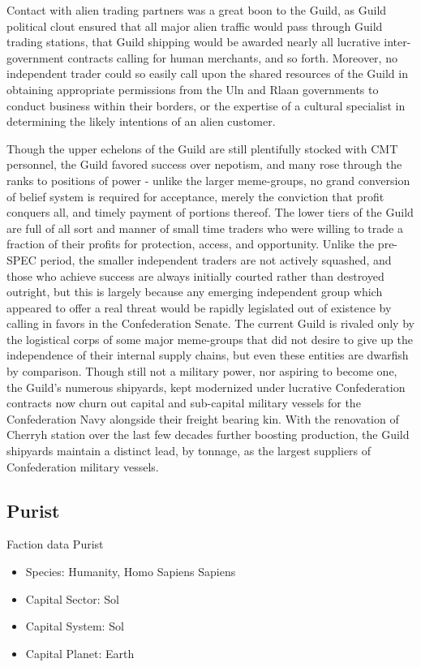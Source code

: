 Contact with alien trading partners was a great boon to the Guild, as
Guild political clout ensured that all major alien traffic would pass
through Guild trading stations, that Guild shipping would be awarded
nearly all lucrative inter-government contracts calling for human
merchants, and so forth. Moreover, no independent trader could so
easily call upon the shared resources of the Guild in obtaining
appropriate permissions from the Uln and Rlaan governments to conduct
business within their borders, or the expertise of a cultural
specialist in determining the likely intentions of an alien customer.

Though the upper echelons of the Guild are still plentifully stocked
with CMT personnel, the Guild favored success over nepotism, and many
rose through the ranks to positions of power - unlike the larger
meme-groups, no grand conversion of belief system is required for
acceptance, merely the conviction that profit conquers all, and timely
payment of portions thereof. The lower tiers of the Guild are full of
all sort and manner of small time traders who were willing to trade a
fraction of their profits for protection, access, and
opportunity. Unlike the pre-SPEC period, the smaller independent
traders are not actively squashed, and those who achieve success are
always initially courted rather than destroyed outright, but this is
largely because any emerging independent group which appeared to offer
a real threat would be rapidly legislated out of existence by calling
in favors in the Confederation Senate. The current Guild is rivaled
only by the logistical corps of some major meme-groups that did not
desire to give up the independence of their internal supply chains,
but even these entities are dwarfish by comparison. Though still not a
military power, nor aspiring to become one, the Guild's numerous
shipyards, kept modernized under lucrative Confederation contracts now
churn out capital and sub-capital military vessels for the
Confederation Navy alongside their freight bearing kin. With the
renovation of Cherryh station over the last few decades further
boosting production, the Guild shipyards maintain a distinct lead, by
tonnage, as the largest suppliers of Confederation military vessels.

\subsection{Purist}

Faction data Purist
\begin{itemize}
\item Species: Humanity, Homo Sapiens Sapiens
\item Capital Sector: Sol
\item Capital System: Sol
\item Capital Planet: Earth
\end{itemize}

